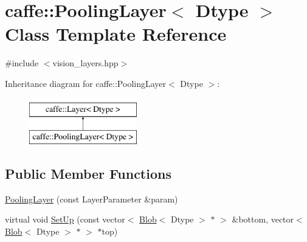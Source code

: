 \hypertarget{classcaffe_1_1_pooling_layer}{\section{caffe\+:\+:Pooling\+Layer$<$ Dtype $>$ Class Template Reference}
\label{classcaffe_1_1_pooling_layer}
}


{\ttfamily \#include $<$vision\+\_\+layers.\+hpp$>$}

Inheritance diagram for caffe\+:\+:Pooling\+Layer$<$ Dtype $>$\+:\begin{figure}[H]
\begin{center}
\leavevmode
\includegraphics[height=2.000000cm]{classcaffe_1_1_pooling_layer}
\end{center}
\end{figure}
\subsection*{Public Member Functions}
\begin{DoxyCompactItemize}
\item 
\hyperlink{classcaffe_1_1_pooling_layer_a3bc79b6101f5e21bbbfa02b7726d650c}{Pooling\+Layer} (const Layer\+Parameter \&param)
\item 
virtual void \hyperlink{classcaffe_1_1_pooling_layer_ac88da7bd4cb54fceb0a22a6efc61292e}{Set\+Up} (const vector$<$ \hyperlink{classcaffe_1_1_blob}{Blob}$<$ Dtype $>$ $\ast$ $>$ \&bottom, vector$<$ \hyperlink{classcaffe_1_1_blob}{Blob}$<$ Dtype $>$ $\ast$ $>$ $\ast$top)
\end{DoxyCompactItemize}
